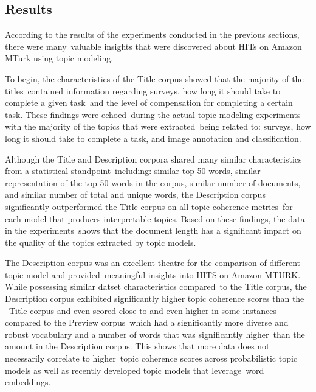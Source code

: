 \documentclass[letterpaper,12pt]{article}
\begin{document}
\subsection{Results}
According to the results of the experiments conducted in the previous sections, there were many\
valuable insights that were discovered about HITs on Amazon MTurk using topic modeling.\

To begin, the characteristics of the Title corpus showed that the majority of the titles\
contained information regarding surveys, how long it should take to complete a given task\
and the level of compensation for completing a certain task. These findings were echoed\
during the actual topic modeling experiments with the majority of the topics that were extracted\
being related to: surveys, how long it should take to complete a task, and image annotation and classification.

Although the Title and Description corpora shared many similar characteristics from a statistical standpoint\
including: similar top 50 words, similar representation of the top 50 words in the corpus, similar number of documents,
and similar number of total and unique words, the Description corpus significantly outperformed the Title corpus on all topic coherence metrics\
for each model that produces interpretable topics. Based on these findings, the data in the experiments\
shows that the document length has a significant impact on the quality of the topics extracted by topic models.

The Description corpus was an excellent theatre for the comparison of different topic model and provided\
meaningful insights into HITS on Amazon MTURK. While possessing similar datset characteristics compared\
to the Title corpus, the Description corpus exhibited significantly higher topic coherence scores than the \
Title corpus and even scored close to and even higher in some instances compared to the Preview corpus\
which had a significantly more diverse and robust vocabulary and a number of words that was significantly higher\
than the amount in the Description corpus. This shows that more data does not necessarily correlate to higher\
topic coherence scores across probabilistic topic models as well as recently developed topic models that leverage\
word embeddings.
\end{document}
